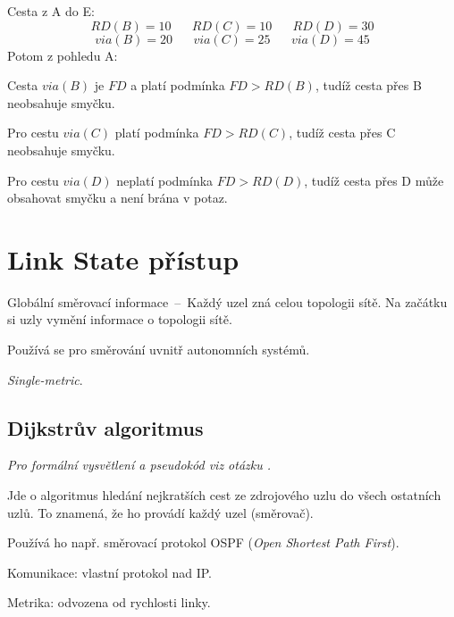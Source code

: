 \noindent Cesta z A do E:
$$
RD(B) = 10 \;\;\;\;\;\;
RD(C) = 10 \;\;\;\;\;\;
RD(D) = 30
$$
$$
via(B) = 20 \;\;\;\;\;\;
via(C) = 25 \;\;\;\;\;\;
via(D) = 45
$$
Potom z pohledu A: \begin{compactitem}
    \item Cesta $via(B)$ je $FD$ a platí podmínka $FD > RD(B)$, tudíž cesta přes B neobsahuje smyčku.
    \item Pro cestu $via(C)$ platí podmínka $FD > RD(C)$, tudíž cesta přes C neobsahuje smyčku.
    \item Pro cestu $via(D)$ neplatí podmínka $FD > RD(D)$, tudíž cesta přes D může obsahovat smyčku a není brána v potaz.
\end{compactitem}


\section{Link State přístup}

\begin{compactitem}
    \item Globální směrovací informace~--~Každý uzel zná celou topologii sítě. Na začátku si uzly vymění informace o topologii sítě.
    \item Používá se pro směrování uvnitř autonomních systémů.
    \item \textit{Single-metric}.
\end{compactitem}

\subsection*{Dijkstrův algoritmus}

\begin{compactitem}
    \item \textit{Pro formální vysvětlení a pseudokód viz otázku .}
    \item Jde o algoritmus hledání nejkratších cest ze zdrojového uzlu do všech ostatních uzlů. To znamená, že ho provádí každý uzel (směrovač).
    \item Používá ho např. směrovací protokol OSPF (\textit{Open Shortest Path First}). \begin{compactitem}
        \item Komunikace: vlastní protokol nad IP.
        \item Metrika: odvozena od rychlosti linky.
    \end{compactitem}
\end{compactitem}

